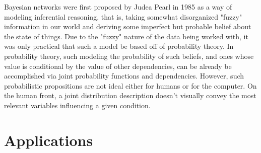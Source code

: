 \documentclass{article}
\begin{document}
Bayesian networks were first proposed by Judea Pearl in 1985 as a way of modeling inferential reasoning, that is, taking somewhat disorganized "fuzzy" information in our world and deriving some imperfect but probable belief about the state of things. Due to the "fuzzy" nature of the data being worked with, it was only practical that such a model be based off of probability theory. In probability theory, such modeling the probability of such beliefs, and ones whose value is conditional by the value of other dependencies, can be already be accomplished via joint probability functions and dependencies. However, such probabilistic propositions are not ideal either for humans or for the computer. On the human front, a joint distribution description doesn't visually convey the most relevant variables influencing a given condition. 

\cite{murphy02}

\section{Applications}



\end{document}

